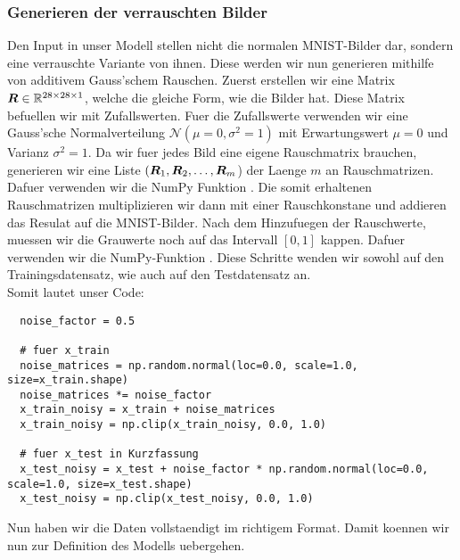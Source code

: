 \subsubsection{Generieren der verrauschten Bilder}
Den Input in unser Modell stellen nicht die normalen MNIST-Bilder dar, sondern
eine verrauschte Variante von ihnen. Diese werden wir nun generieren mithilfe
von additivem Gauss'schem Rauschen.
\para{}
Zuerst erstellen wir eine Matrix $\bm{R} \in \mathbb{R}^{28 \times 28 \times 1}$, welche die gleiche Form, wie die
Bilder hat. Diese Matrix befuellen wir mit Zufallswerten. Fuer die
Zufallswerte verwenden wir eine Gauss'sche Normalverteilung
$\mathcal{N}(\mu = 0, \sigma^2 = 1)$ mit Erwartungswert $\mu = 0$ und Varianz
$\sigma^2 = 1$. Da wir fuer jedes Bild eine eigene Rauschmatrix brauchen,
generieren wir eine Liste $(\bm{R}_1,\bm{R}_2,\ldots,\bm{R}_m$) der Laenge $m$ an
Rauschmatrizen. Dafuer verwenden wir die NumPy Funktion
.
Die somit erhaltenen Rauschmatrizen multiplizieren wir dann mit einer
Rauschkonstane  und addieren das Resulat auf die MNIST-Bilder.
Nach dem Hinzufuegen der Rauschwerte, muessen wir die Grauwerte noch auf das Intervall
$[0,1]$ kappen. Dafuer verwenden wir die NumPy-Funktion . Diese Schritte wenden
wir sowohl auf den Trainingsdatensatz, wie auch auf den Testdatensatz an. \\
Somit lautet unser Code:
\begin{verbatim}
  noise_factor = 0.5

  # fuer x_train
  noise_matrices = np.random.normal(loc=0.0, scale=1.0, size=x_train.shape)
  noise_matrices *= noise_factor
  x_train_noisy = x_train + noise_matrices
  x_train_noisy = np.clip(x_train_noisy, 0.0, 1.0)

  # fuer x_test in Kurzfassung
  x_test_noisy = x_test + noise_factor * np.random.normal(loc=0.0, scale=1.0, size=x_test.shape)
  x_test_noisy = np.clip(x_test_noisy, 0.0, 1.0)
\end{verbatim}
\para{}
Nun haben wir die Daten vollstaendigt im richtigem Format. Damit koennen wir nun
zur Definition des Modells uebergehen.

